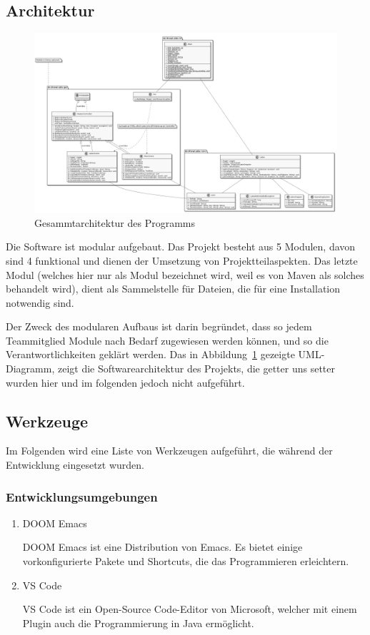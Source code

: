 \documentclass[stu, a4paper, 11pt, floatsintext]{apa7}
\begin{document}
\subsection{Architektur}

\begin{figure}[!htbp]
\centering
\includegraphics[width=.9\linewidth]{../technical_documentation/diagramm/uml/aids.png}
\caption{\label{Gesammtarchitektur}Gesammtarchitektur des Programms}
\end{figure}
\noindent Die Software ist modular aufgebaut. Das Projekt besteht aus 5 Modulen, davon sind 4 funktional und dienen der Umsetzung von Projektteilaspekten.
Das letzte Modul (welches hier nur als Modul bezeichnet wird, weil es von Maven als solches behandelt wird), dient als Sammelstelle für Dateien, die für eine Installation notwendig sind.

Der Zweck des modularen Aufbaus ist darin begründet, dass so jedem Teammitglied Module nach Bedarf zugewiesen werden können, und so die Verantwortlichkeiten geklärt werden.
Das in Abbildung~\ref{Gesammtarchitektur} gezeigte UML-Diagramm, zeigt die Softwarearchitektur des Projekts, die getter uns setter wurden hier und im folgenden jedoch nicht aufgeführt.

\subsection{Werkzeuge}
\noindent Im Folgenden wird eine Liste von Werkzeugen aufgeführt, die während der Entwicklung eingesetzt wurden.

\subsubsection{Entwicklungsumgebungen}
\begin{enumerate}
\item DOOM Emacs

DOOM Emacs ist eine Distribution von Emacs.
Es bietet einige vorkonfigurierte Pakete und Shortcuts, die das Programmieren erleichtern.

\item VS Code

VS Code ist ein Open-Source Code-Editor von Microsoft,
welcher mit einem Plugin auch die Programmierung in Java ermöglicht.
\end{enumerate}
\end{document}
